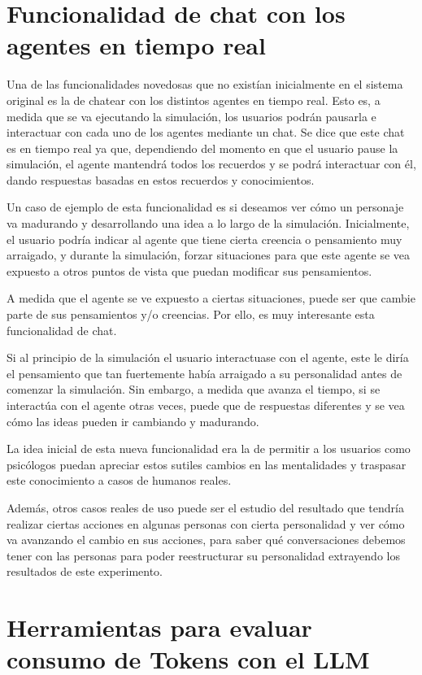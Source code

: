 \section{Funcionalidad de chat con los agentes en tiempo real}

Una de las funcionalidades novedosas que no existían inicialmente en el sistema original es la de chatear con los distintos agentes en tiempo real. Esto es, a medida que se va ejecutando la simulación, los usuarios podrán pausarla e interactuar con cada uno de los agentes mediante un chat. Se dice que este chat es en tiempo real ya que, dependiendo del momento en que el usuario pause la simulación, el agente mantendrá todos los recuerdos y se podrá interactuar con él, dando respuestas basadas en estos recuerdos y conocimientos.

Un caso de ejemplo de esta funcionalidad es si deseamos ver cómo un personaje va madurando y desarrollando una idea a lo largo de la simulación. Inicialmente, el usuario podría indicar al agente que tiene cierta creencia o pensamiento muy arraigado, y durante la simulación, forzar situaciones para que este agente se vea expuesto a otros puntos de vista que puedan modificar sus pensamientos.

A medida que el agente se ve expuesto a ciertas situaciones, puede ser que cambie parte de sus pensamientos y/o creencias. Por ello, es muy interesante esta funcionalidad de chat.

Si al principio de la simulación el usuario interactuase con el agente, este le diría el pensamiento que tan fuertemente había arraigado a su personalidad antes de comenzar la simulación. Sin embargo, a medida que avanza el tiempo, si se interactúa con el agente otras veces, puede que de respuestas diferentes y se vea cómo las ideas pueden ir cambiando y madurando.

La idea inicial de esta nueva funcionalidad era la de permitir a los usuarios como psicólogos puedan apreciar estos sutiles cambios en las mentalidades y traspasar este conocimiento a casos de humanos reales.

Además, otros casos reales de uso puede ser el estudio del resultado que tendría realizar ciertas acciones en algunas personas con cierta personalidad y ver cómo va avanzando el cambio en sus acciones, para saber qué conversaciones debemos tener con las personas para poder reestructurar su personalidad extrayendo los resultados de este experimento.

\section{Herramientas para evaluar consumo de Tokens con el LLM}


